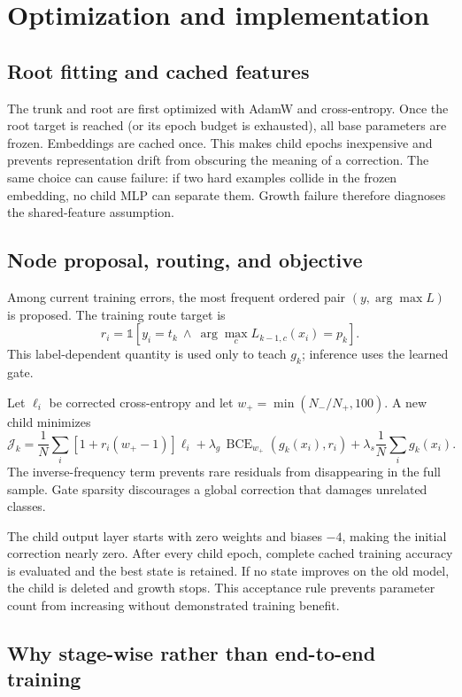 \documentclass[11pt,a4paper]{article}
\begin{document}
\section{Optimization and implementation}

\subsection{Root fitting and cached features}

The trunk and root are first optimized with AdamW and cross-entropy. Once the
root target is reached (or its epoch budget is exhausted), all base parameters
are frozen. Embeddings are cached once. This makes child epochs inexpensive
and prevents representation drift from obscuring the meaning of a correction.
The same choice can cause failure: if two hard examples collide in the frozen
embedding, no child MLP can separate them. Growth failure therefore diagnoses
the shared-feature assumption.

\subsection{Node proposal, routing, and objective}

Among current training errors, the most frequent ordered pair
\((y,\arg\max L)\) is proposed. The training route target is
\[
r_i=\mathbb{1}\!\left[
y_i=t_k\ \land\
\arg\max_c L_{k-1,c}(x_i)=p_k\right].
\]
This label-dependent quantity is used only to teach \(g_k\); inference uses the
learned gate.

Let \(\ell_i\) be corrected cross-entropy and let
\(w_+=\min(N_-/N_+,100)\). A new child minimizes
\[
\mathcal{J}_k=
\frac1N\sum_i[1+r_i(w_+-1)]\ell_i
+\lambda_g\,\operatorname{BCE}_{w_+}(g_k(x_i),r_i)
+\lambda_s\frac1N\sum_i g_k(x_i).
\]
The inverse-frequency term prevents rare residuals from disappearing in the
full sample. Gate sparsity discourages a global correction that damages
unrelated classes.

The child output layer starts with zero weights and biases \(-4\), making the
initial correction nearly zero. After every child epoch, complete cached
training accuracy is evaluated and the best state is retained. If no state
improves on the old model, the child is deleted and growth stops. This
acceptance rule prevents parameter count from increasing without demonstrated
training benefit.

\subsection{Why stage-wise rather than end-to-end training}
\end{document}
